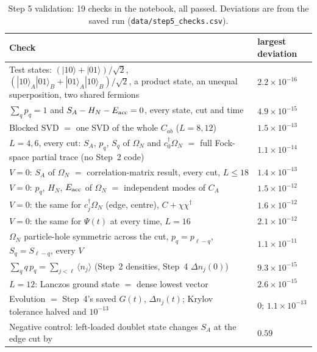 \documentclass[11pt,a4paper]{article}
\newcommand{\dg}{^{\dagger}}
\begin{document}
\begin{table}[t]
  \centering
  \footnotesize
  \begin{tabular}{p{11.2cm}l}
    \toprule
    Check & largest deviation \\
    \midrule
    Test states: $(|10\rangle+|01\rangle)/\sqrt2$, $(|10\rangle_A|01\rangle_B+|01\rangle_A|10\rangle_B)/\sqrt2$, a product state, an unequal superposition, two shared fermions & $2.2\times10^{-16}$ \\
    $\sum_qp_q=1$ and $S_A-H_N-E_{\rm acc}=0$, every state, cut and time & $4.9\times10^{-15}$ \\
    Blocked SVD $=$ one SVD of the whole $C_{ab}$ ($L=8,12$) & $1.5\times10^{-13}$ \\
    $L=4,6$, every cut: $S_A$, $p_q$, $S_q$ of $\Omega_N$ and $c_0\dg\Omega_N$ $=$ full Fock-space partial trace (no Step~2 code) & $1.1\times10^{-14}$ \\
    $V=0$: $S_A$ of $\Omega_N$ $=$ correlation-matrix result, every cut, $L\le18$ & $1.4\times10^{-13}$ \\
    $V=0$: $p_q$, $H_N$, $E_{\rm acc}$ of $\Omega_N$ $=$ independent modes of $C_A$ & $1.5\times10^{-12}$ \\
    $V=0$: the same for $c_j\dg\Omega_N$ (edge, centre), $C+\chi\chi\dg$ & $1.6\times10^{-12}$ \\
    $V=0$: the same for $\Psi(t)$ at every time, $L=16$ & $2.1\times10^{-12}$ \\
    $\Omega_N$ particle-hole symmetric across the cut, $p_q=p_{\ell-q}$, $S_q=S_{\ell-q}$, every $V$ & $1.1\times10^{-11}$ \\
    $\sum_qq\,p_q=\sum_{j<\ell}\langle n_j\rangle$ (Step~2 densities, Step~4 $\Delta n_j(0)$) & $9.3\times10^{-15}$ \\
    $L=12$: Lanczos ground state $=$ dense lowest vector & $2.6\times10^{-15}$ \\
    Evolution $=$ Step~4's saved $G(t)$, $\Delta n_j(t)$; Krylov tolerance halved and $10^{-13}$ & $0$; $1.1\times10^{-13}$ \\
    Negative control: left-loaded doublet state changes $S_A$ at the edge cut by & $0.59$ \\
    \bottomrule
  \end{tabular}
  \caption{Step 5 validation: 19 checks in the notebook, all passed. Deviations are from the saved run (\texttt{data/step5\_checks.csv}).}
  \label{tab:checks5}
\end{table}
\end{document}
